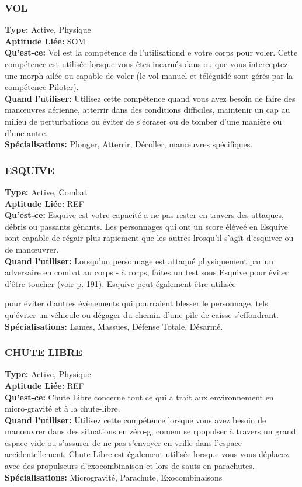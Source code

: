\subsubsection{VOL} \textbf{Type:} Active, Physique\\ \textbf{Aptitude Liée:} SOM \\ \textbf{Qu'est-ce:} Vol est la compétence de l'utilisationd e votre corps pour voler. Cette compétence est utilisée lorsque vous êtes incarnés dans ou que vous interceptez une morph ailée ou capable de voler (le vol manuel et téléguidé sont gérés par la compétence Piloter). \\ \textbf{Quand l'utiliser:} Utilisez cette compétence quand vous avez besoin de faire des manœuvres aérienne, atterrir dans des conditions difficiles, maintenir un cap au milieu de perturbations ou éviter de s'écraser ou de tomber d'une manière ou d'une autre. \\ \textbf{Spécialisations:} Plonger, Atterrir, Décoller, manœuvres spécifiques. 

\subsubsection{ESQUIVE} \textbf{Type:} Active, Combat \\ \textbf{Aptitude Liée:} REF \\ \textbf{Qu'est-ce:} Esquive est votre capacité a ne pas rester en travers des attaques, débris ou passants génants. Les personnages qui ont un score éléveé en Esquive sont capable de régair plus rapiement que les autres lrosqu'il s'agît d'esquiver ou de manœuvrer. \\ \textbf{Quand l'utiliser: } Lorsqu'un personnage est attaqué physiquement par un adversaire en combat au corps - à corps, faites un test sous Esquive pour éviter d'être toucher (voir p. 191). Esquive peut également être utilisée 

pour éviter d'autres évènements qui pourraient blesser le personnage, tels qu'éviter un véhicule ou dégager du chemin d'une pile de caisse s'effondrant. \\ \textbf{Spécialisations:} Lames, Massues, Défense Totale, Désarmé. 

\subsubsection{CHUTE LIBRE} \textbf{Type:} Active, Physique\\ \textbf{Aptitude Liée:} REF \\ \textbf{Qu'est-ce:} Chute Libre concerne tout ce qui a trait aux environnement en micro-gravité et à la chute-libre. \\ \textbf{Quand l'utiliser:} Utilisez cette compétence lorsque vous avez besoin de manœuvrer dans des situations en zéro-g, comem se rpopulser à travers un grand espace vide ou s'assurer de ne pas s'envoyer en vrille dans l'espace accidentellement. Chute Libre est également utilisée lorsque vous vous déplacez avec des propulseurs d'exocombinaison et lors de sauts en parachutes. \\ \textbf{Spécialisations:} Microgravité, Parachute, Exocombinaisons 

